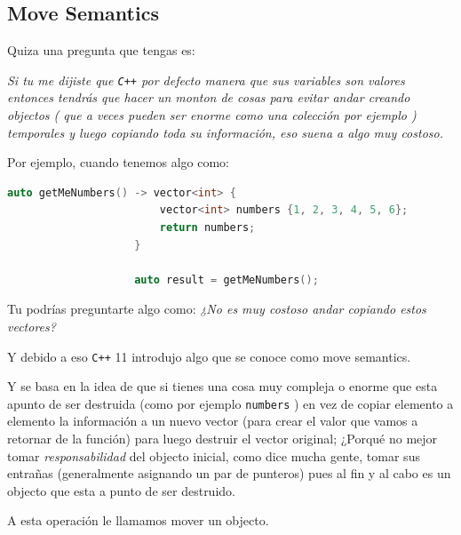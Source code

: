\documentclass[12pt, fleqn]{report}                             %
\theoremstyle{break}                                            %
\newcommand{\textCode}[1]  { \texttt{#1} }                      %
\newcommand{\Cpp}{\ignorespaces\textCode{C++}}                  %
\begin{document}
            \subsection{Move Semantics}     
            
                Quiza una pregunta que tengas es:

                \textit{
                    Si tu me dijiste que \Cpp por defecto manera que sus variables son valores
                    entonces tendrás que hacer un monton de cosas para evitar andar creando objectos (
                        que a veces pueden ser enorme como una colección por ejemplo
                    ) temporales y luego copiando toda su información, eso suena a algo muy costoso.
                }

                Por ejemplo, cuando tenemos algo como:
                \begin{lstlisting}[language=C++, gobble=20]
                    auto getMeNumbers() -> vector<int> {
                        vector<int> numbers {1, 2, 3, 4, 5, 6};
                        return numbers;
                    }

                    auto result = getMeNumbers();
                \end{lstlisting}

                Tu podrías preguntarte algo como:
                \textit{
                    ¿No es muy costoso andar copiando estos vectores? 
                }

                Y debido a eso \Cpp 11 introdujo algo que se conoce como move semantics.

                Y se basa en la idea de que si tienes una cosa muy compleja o enorme
                que esta apunto de ser destruida (como por ejemplo \textCode{numbers})
                en vez de copiar elemento a elemento la información a un nuevo vector (para crear
                el valor que vamos a retornar de la función) 
                para luego destruir el vector original; ¿Porqué no mejor tomar \emph{responsabilidad}
                del objecto inicial, como dice mucha gente, tomar sus entrañas  
                (generalmente asignando un par de punteros) pues al fin y al cabo es un objecto que esta a punto
                de ser destruido. 

                A esta operación le llamamos mover un objecto.
\end{document}
